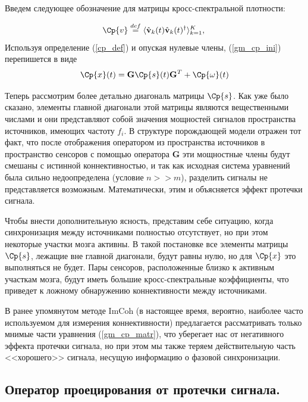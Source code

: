 Введем следующее обозначение для матрицы кросс-спектральной плотности:

\begin{equation}
    \Cp{v} \stackrel{def}{=} \langle{\hat{\mathbf{v}}_k(t) \hat{\mathbf{v}}_k(t)^{\dag}}\rangle_{k=1}^K, \\
    \label{cp_def}
\end{equation}
Используя определение (\ref{cp_def}) и опуская нулевые члены, (\ref{gm_cp_ini})
перепишется в виде
\begin{equation}
    \Cp{x}(t) = \mathbf{G} \Cp{s}(t) \mathbf{G}^T + \Cp{\omega}(t)
    \label{gm_cp_matr}
\end{equation}

Теперь рассмотрим более детально диагональ матрицы $\Cp{s}$.
Как уже было сказано, элементы главной диагонали этой матрицы являются вещественными числами
и они представляют собой значения мощностей сигналов пространства источников,
имеющих частоту $f_i$. В структуре порождающей модели отражен тот факт,
что после отображения оператором из пространства источников в пространство сенсоров
с помощью оператора $\mathbf{G}$ эти мощностные члены будут смешаны с истинной коннективностью,
и так как исходная система уравнений была сильно недоопределена (условие $n >> m$),
разделить сигналы не представляется возможным.
Математически, этим и объясняется эффект протечки сигнала.

Чтобы внести дополнительную ясность, представим себе ситуацию,
когда синхронизация между источниками полностью отсутствует,
но при этом некоторые участки мозга активны.
В такой постановке все элементы матрицы $\Cp{s}$, лежащие вне главной диагонали,
будут равны нулю, но для $\Cp{x}$ это выполняться не будет.
Пары сенсоров, расположенные близко к активным участкам мозга,
будут иметь большие кросс-спектральные коэффициенты,
что приведет к ложному обнаружению коннективности между источниками.

В ранее упомянутом методе ImCoh (в настоящее время, вероятно,
наиболее часто используемом для измерения коннективности)
предлагается рассматривать только мнимые части уравнения (\ref{gm_cp_matr}),
что уберегает нас от негативного эффекта протечки сигнала,
но при этом мы также теряем действительную часть <<хорошего>> сигнала, несущую
информацию о фазовой синхронизации.

\subsection{Оператор проецирования от протечки сигнала.}


